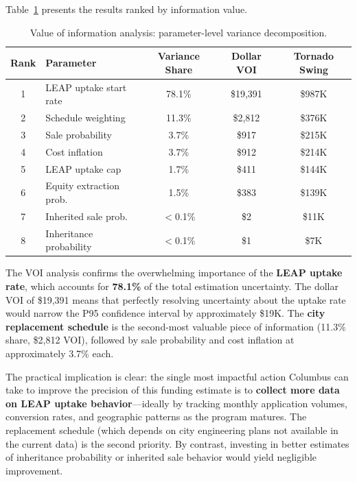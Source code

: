 \documentclass[11pt, letterpaper]{article}
\begin{document}
Table~\ref{tab:voi} presents the results ranked by information value.

\begin{table}[H]
  \centering
  \caption{Value of information analysis: parameter-level variance decomposition.}
  \label{tab:voi}
  \begin{tabular}{@{}clccc@{}}
    \toprule
    \textbf{Rank} & \textbf{Parameter} & \textbf{Variance Share} & \textbf{Dollar VOI} & \textbf{Tornado Swing} \\
    \midrule
    1 & LEAP uptake start rate & 78.1\% & \$19{,}391 & \$987K \\
    2 & Schedule weighting & 11.3\% & \$2{,}812 & \$376K \\
    3 & Sale probability & 3.7\% & \$917 & \$215K \\
    4 & Cost inflation & 3.7\% & \$912 & \$214K \\
    5 & LEAP uptake cap & 1.7\% & \$411 & \$144K \\
    6 & Equity extraction prob. & 1.5\% & \$383 & \$139K \\
    7 & Inherited sale prob. & $<$0.1\% & \$2 & \$11K \\
    8 & Inheritance probability & $<$0.1\% & \$1 & \$7K \\
    \bottomrule
  \end{tabular}
\end{table}

The VOI analysis confirms the overwhelming importance of the \textbf{LEAP uptake rate}, which accounts for \textbf{78.1\%} of the total estimation uncertainty. The dollar VOI of \$19{,}391 means that perfectly resolving uncertainty about the uptake rate would narrow the P95 confidence interval by approximately \$19K. The \textbf{city replacement schedule} is the second-most valuable piece of information (11.3\% share, \$2{,}812 VOI), followed by sale probability and cost inflation at approximately 3.7\% each.

The practical implication is clear: the single most impactful action Columbus can take to improve the precision of this funding estimate is to \textbf{collect more data on LEAP uptake behavior}---ideally by tracking monthly application volumes, conversion rates, and geographic patterns as the program matures. The replacement schedule (which depends on city engineering plans not available in the current data) is the second priority. By contrast, investing in better estimates of inheritance probability or inherited sale behavior would yield negligible improvement.
\end{document}
